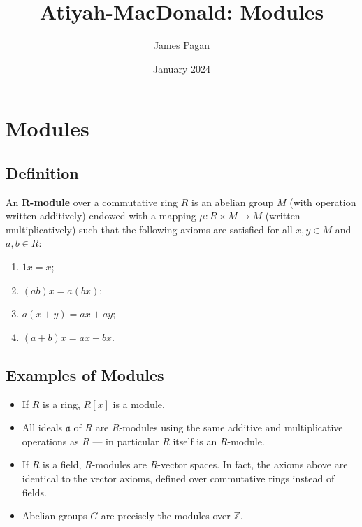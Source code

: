 \documentclass[11pt]{article}
\title{Atiyah-MacDonald: Modules}
\author{James Pagan}
\date{January 2024}
\begin{document}
\maketitle
\tableofcontents

\newpage


\section{Modules}


\subsection{Definition}

An \textbf{R-module} over a commutative ring $R$ is an abelian group $M$ (with operation written additively) endowed with a mapping $\mu : R \times M \to M$ (written multiplicatively) such that the following axioms are satisfied for all $x, y \in M$ and $a, b \in R$:
\begin{enumerate}
	\item $1x = x$;
	\item $(ab)x = a(bx)$;
	\item $a(x + y) = ax + ay$;
	\item $(a + b)x = ax + bx$.
\end{enumerate}


\subsection{Examples of Modules}

\begin{itemize}
	\item If $R$ is a ring, $R[x]$ is a module.
	\item All ideals $\mathfrak{a}$ of $R$ are $R$-modules using the same additive and multiplicative operations as $R$ --- in particular $R$ itself is an $R$-module.
	\item If $R$ is a field, $R$-modules are $R$-vector spaces. In fact, the axioms above are identical to the vector axioms, defined over commutative rings instead of fields.
	\item Abelian groups $G$ are precisely the modules over $\mathbb{Z}$.
\end{itemize}
\end{document}
